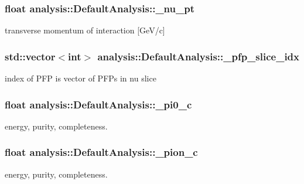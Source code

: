\subsubsection[{\texorpdfstring{\+\_\+nu\+\_\+pt}{_nu_pt}}]{\setlength{\rightskip}{0pt plus 5cm}float analysis\+::\+Default\+Analysis\+::\+\_\+nu\+\_\+pt\hspace{0.3cm}{\ttfamily [private]}}\hypertarget{classanalysis_1_1DefaultAnalysis_a901956985dfd610c781bedf7bfc9754a}{}\label{classanalysis_1_1DefaultAnalysis_a901956985dfd610c781bedf7bfc9754a}
transverse momentum of interaction \mbox{[}Ge\+V/c\mbox{]} 
\subsubsection[{\texorpdfstring{\+\_\+pfp\+\_\+slice\+\_\+idx}{_pfp_slice_idx}}]{\setlength{\rightskip}{0pt plus 5cm}std\+::vector$<$int$>$ analysis\+::\+Default\+Analysis\+::\+\_\+pfp\+\_\+slice\+\_\+idx\hspace{0.3cm}{\ttfamily [private]}}\hypertarget{classanalysis_1_1DefaultAnalysis_acbf0c279993cbefca72f38bc5e9f6627}{}\label{classanalysis_1_1DefaultAnalysis_acbf0c279993cbefca72f38bc5e9f6627}
index of P\+FP is vector of P\+F\+Ps in nu slice 
\subsubsection[{\texorpdfstring{\+\_\+pi0\+\_\+c}{_pi0_c}}]{\setlength{\rightskip}{0pt plus 5cm}float analysis\+::\+Default\+Analysis\+::\+\_\+pi0\+\_\+c\hspace{0.3cm}{\ttfamily [private]}}\hypertarget{classanalysis_1_1DefaultAnalysis_a255069926e7e8a83629b9dac19bf7473}{}\label{classanalysis_1_1DefaultAnalysis_a255069926e7e8a83629b9dac19bf7473}
energy, purity, completeness. 
\subsubsection[{\texorpdfstring{\+\_\+pion\+\_\+c}{_pion_c}}]{\setlength{\rightskip}{0pt plus 5cm}float analysis\+::\+Default\+Analysis\+::\+\_\+pion\+\_\+c\hspace{0.3cm}{\ttfamily [private]}}\hypertarget{classanalysis_1_1DefaultAnalysis_a9978effbcfba62536fc88a73fa985fe9}{}\label{classanalysis_1_1DefaultAnalysis_a9978effbcfba62536fc88a73fa985fe9}
energy, purity, completeness. 
